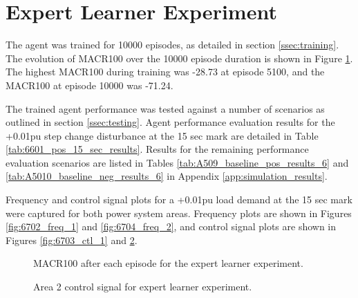 \section{Expert Learner Experiment}
The agent was trained for 10000 episodes, as detailed in section \ref{ssec:training}. The evolution of MACR100 over the 10000 episode duration is shown in Figure \ref{fig:6701_average_reward}. The highest MACR100 during training was -28.73 at episode 5100, and the MACR100 at episode 10000 was -71.24.

The trained agent performance was tested against a number of scenarios as outlined in section \ref{ssec:testing}. Agent performance evaluation results for the +0.01pu step change disturbance at the 15 sec mark are detailed in Table \ref{tab:6601_pos_15_sec_results}. Results for the remaining performance evaluation scenarios are listed in Tables \ref{tab:A509_baseline_pos_results_6} and \ref{tab:A5010_baseline_neg_results_6} in Appendix \ref{app:simulation_results}.

Frequency and control signal plots for a +0.01pu load demand at the 15 sec mark were captured for both power system areas. Frequency plots are shown in Figures \ref{fig:6702_freq_1} and \ref{fig:6704_freq_2}, and control signal plots are shown in Figures \ref{fig:6703_ctl_1} and \ref{fig:6705_ctl_2}.

\begin{figure}[h]
	\centering
	
	\caption{MACR100 after each episode for the expert learner experiment.}\label{fig:6701_average_reward}
\end{figure}



\begin{figure}[h]
	\centering
	
	
	\vspace{-0.5cm}
	\caption{Area 1 frequency response for expert learner experiment.}\label{fig:6702_freq_1}
	
	\vspace{0.5cm}
	
	
	\vspace{-0.5cm}
	\caption{Area 1 control signal for expert learner experiment.}\label{fig:6703_ctl_1}
	
	\vspace{0.5cm}
	
	
	\vspace{-0.5cm}
	\caption{Area 2 frequency response for expert learner experiment.}\label{fig:6704_freq_2}
	
	\vspace{0.5cm}
				
	
	\vspace{-0.5cm}
	\caption{Area 2 control signal for expert learner experiment.}\label{fig:6705_ctl_2}
\end{figure}